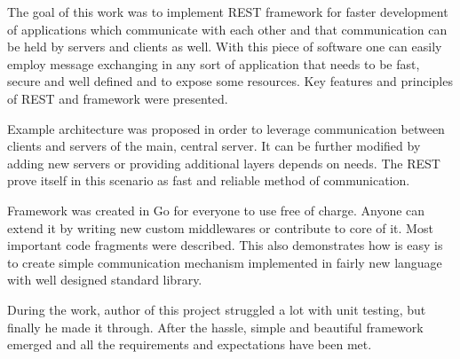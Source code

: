 The goal of this work was to implement REST framework for faster development of applications which communicate with each other and that communication can be held by servers and clients as well. With this piece of software one can easily employ message exchanging in any sort of application that needs to be fast, secure and well defined and to expose some resources. Key features and principles of REST and framework were presented.

Example architecture was proposed in order to leverage communication between clients and servers of the main, central server. It can be further modified by adding new servers or providing additional layers depends on needs. The REST prove itself in this scenario as fast and reliable method of communication.

Framework was created in Go for everyone to use free of charge. Anyone can extend it by writing new custom middlewares or contribute to core of it. Most important code fragments were described. This also demonstrates how is easy is to create simple communication mechanism implemented in fairly new language with well designed standard library.

During the work, author of this project struggled a lot with unit testing, but finally he made it through. After the hassle, simple and beautiful framework emerged and all the requirements and expectations have been met.
